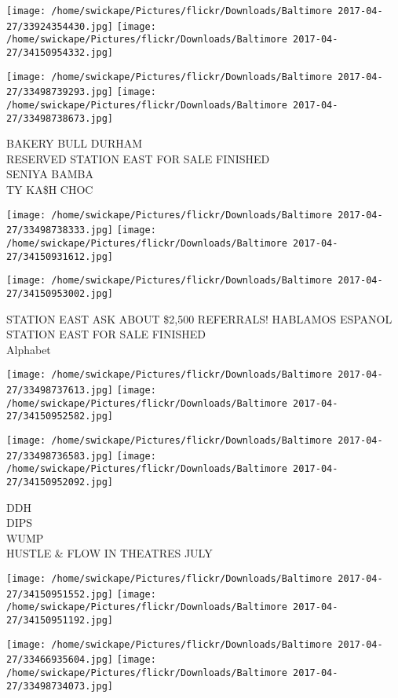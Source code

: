 \documentclass[10pt,letterpaper]{article}
\begin{document}
\texttt{[image: /home/swickape/Pictures/flickr/Downloads/Baltimore 2017-04-27/33924354430.jpg]}
\texttt{[image: /home/swickape/Pictures/flickr/Downloads/Baltimore 2017-04-27/34150954332.jpg]}

\texttt{[image: /home/swickape/Pictures/flickr/Downloads/Baltimore 2017-04-27/33498739293.jpg]}
\texttt{[image: /home/swickape/Pictures/flickr/Downloads/Baltimore 2017-04-27/33498738673.jpg]}

BAKERY BULL DURHAM\\
RESERVED STATION EAST FOR SALE FINISHED\\
SENIYA BAMBA\\
TY KA\$H CHOC
\pagebreak

\texttt{[image: /home/swickape/Pictures/flickr/Downloads/Baltimore 2017-04-27/33498738333.jpg]}
\texttt{[image: /home/swickape/Pictures/flickr/Downloads/Baltimore 2017-04-27/34150931612.jpg]}

\vspace{0.25in}
\texttt{[image: /home/swickape/Pictures/flickr/Downloads/Baltimore 2017-04-27/34150953002.jpg]}

STATION EAST ASK ABOUT \$2,500 REFERRALS!  HABLAMOS ESPANOL\\
STATION EAST FOR SALE FINISHED\\
Alphabet
\pagebreak

\texttt{[image: /home/swickape/Pictures/flickr/Downloads/Baltimore 2017-04-27/33498737613.jpg]}
\texttt{[image: /home/swickape/Pictures/flickr/Downloads/Baltimore 2017-04-27/34150952582.jpg]}

\texttt{[image: /home/swickape/Pictures/flickr/Downloads/Baltimore 2017-04-27/33498736583.jpg]}
\texttt{[image: /home/swickape/Pictures/flickr/Downloads/Baltimore 2017-04-27/34150952092.jpg]}

DDH\\
DIPS\\
WUMP\\
HUSTLE \& FLOW IN THEATRES JULY
\pagebreak

\texttt{[image: /home/swickape/Pictures/flickr/Downloads/Baltimore 2017-04-27/34150951552.jpg]}
\texttt{[image: /home/swickape/Pictures/flickr/Downloads/Baltimore 2017-04-27/34150951192.jpg]}

\texttt{[image: /home/swickape/Pictures/flickr/Downloads/Baltimore 2017-04-27/33466935604.jpg]}
\texttt{[image: /home/swickape/Pictures/flickr/Downloads/Baltimore 2017-04-27/33498734073.jpg]}
\end{document}

